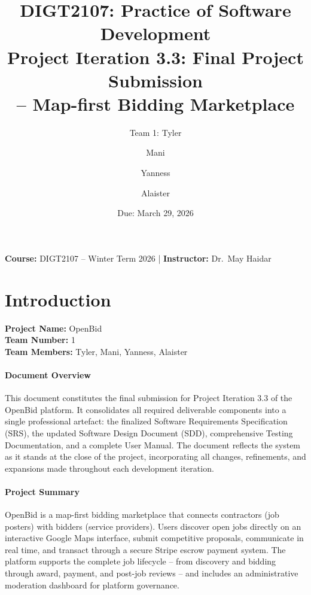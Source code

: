 \documentclass[11pt]{article}
\title{DIGT2107: Practice of Software Development\\
\Large Project Iteration 3.3: Final Project Submission\\[4pt]
\large \product{} -- Map-first Bidding Marketplace}
\author{Team 1: Tyler \and Mani \and Yanness \and Alaister}
\date{Due: March 29, 2026}
\newcommand{\product}{OpenBid}
\begin{document}
\maketitle

\begin{center}
\textbf{Course:} DIGT2107 -- Winter Term 2026 \quad|\quad
\textbf{Instructor:} Dr.\ May Haidar
\end{center}

\section{Introduction}

\textbf{Project Name:} \product \\
\textbf{Team Number:} 1 \\
\textbf{Team Members:} Tyler, Mani, Yanness, Alaister

\paragraph{Document Overview}
This document constitutes the final submission for Project Iteration 3.3 of the OpenBid
platform. It consolidates all required deliverable components into a single professional
artefact: the finalized Software Requirements Specification (SRS), the updated Software
Design Document (SDD), comprehensive Testing Documentation, and a complete User Manual.
The document reflects the system as it stands at the close of the project, incorporating
all changes, refinements, and expansions made throughout each development iteration.

\paragraph{Project Summary}
OpenBid is a map-first bidding marketplace that connects contractors (job posters) with
bidders (service providers). Users discover open jobs directly on an interactive Google
Maps interface, submit competitive proposals, communicate in real time, and transact
through a secure Stripe escrow payment system. The platform supports the complete job
lifecycle -- from discovery and bidding through award, payment, and post-job reviews --
and includes an administrative moderation dashboard for platform governance.
\end{document}
